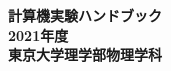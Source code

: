 \documentclass[a4j]{jsbook}
\newcommand{\nendo}{2021}
\begin{document}
\thispagestyle{empty}
\pagestyle{empty}
\begin{titlepage}
\vspace*{5cm}
\begin{center}
{\Huge\bf 計算機実験ハンドブック}\\
\vspace*{14cm}
{\LARGE\bf \nendo 年度}\\
\vspace{1.0cm}
{\LARGE\bf 東京大学理学部物理学科}
\end{center}
\end{titlepage}
\clearpage
\pagestyle{empty}
\cleardoublepage


\clearpage

\cleardoublepage

\setcounter{page}{1}
\setcounter{tocdepth}{3}
\tableofcontents

\clearpage
\pagestyle{plain}
\cleardoublepage






\end{document}
